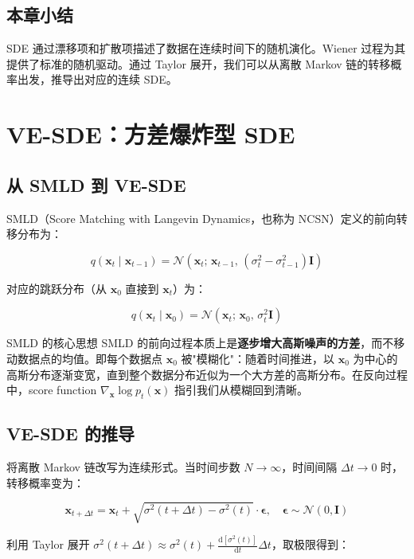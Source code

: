 \documentclass[a4paper]{article}
\begin{document}
\subsection{本章小结}

SDE 通过漂移项和扩散项描述了数据在连续时间下的随机演化。Wiener 过程为其提供了标准的随机驱动。通过 Taylor 展开，我们可以从离散 Markov 链的转移概率出发，推导出对应的连续 SDE。


\section{VE-SDE：方差爆炸型 SDE}

\subsection{从 SMLD 到 VE-SDE}

SMLD（Score Matching with Langevin Dynamics，也称为 NCSN）定义的前向转移分布为：

$$
q(\mathbf{x}_t \mid \mathbf{x}_{t-1}) = \mathcal{N}\!\left(\mathbf{x}_t;\, \mathbf{x}_{t-1},\, (\sigma_t^2 - \sigma_{t-1}^2)\mathbf{I}\right)
$$

对应的跳跃分布（从 $\mathbf{x}_0$ 直接到 $\mathbf{x}_t$）为：

$$
q(\mathbf{x}_t \mid \mathbf{x}_0) = \mathcal{N}\!\left(\mathbf{x}_t;\, \mathbf{x}_0,\, \sigma_t^2 \mathbf{I}\right)
$$

\begin{importantbox}{SMLD 的核心思想}
SMLD 的前向过程本质上是\textbf{逐步增大高斯噪声的方差}，而不移动数据点的均值。即每个数据点 $\mathbf{x}_0$ 被"模糊化"：随着时间推进，以 $\mathbf{x}_0$ 为中心的高斯分布逐渐变宽，直到整个数据分布近似为一个大方差的高斯分布。在反向过程中，score function $\nabla_{\mathbf{x}} \log p_t(\mathbf{x})$ 指引我们从模糊回到清晰。
\end{importantbox}

\subsection{VE-SDE 的推导}

将离散 Markov 链改写为连续形式。当时间步数 $N \to \infty$，时间间隔 $\Delta t \to 0$ 时，转移概率变为：

$$
\mathbf{x}_{t+\Delta t} = \mathbf{x}_t + \sqrt{\sigma^2(t+\Delta t) - \sigma^2(t)} \cdot \boldsymbol{\epsilon}, \quad \boldsymbol{\epsilon} \sim \mathcal{N}(0, \mathbf{I})
$$

利用 Taylor 展开 $\sigma^2(t+\Delta t) \approx \sigma^2(t) + \frac{\mathrm{d}[\sigma^2(t)]}{\mathrm{d}t}\Delta t$，取极限得到：
\end{document}
